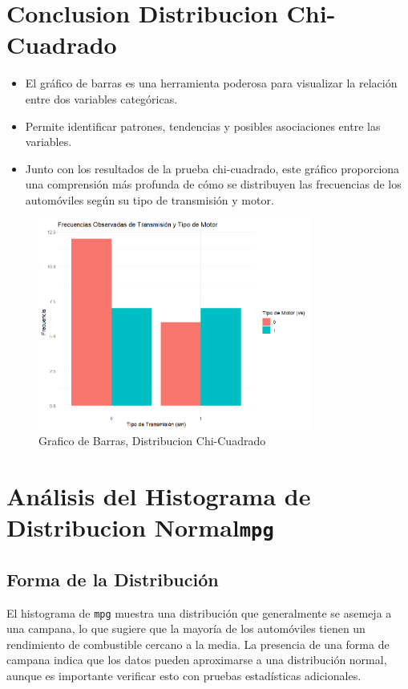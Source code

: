 \documentclass{article}
\begin{document}
\section{Conclusion Distribucion Chi-Cuadrado}
\begin{itemize}
	\item El gráfico de barras es una herramienta poderosa para visualizar la relación entre dos variables categóricas.
	\item Permite identificar patrones, tendencias y posibles asociaciones entre las variables.
	\item Junto con los resultados de la prueba chi-cuadrado, este gráfico proporciona una comprensión más profunda de cómo se distribuyen las frecuencias de los automóviles según su tipo de transmisión y motor.
\end{itemize}
\begin{figure}[H] %
	\centering %
	\includegraphics[width=0.8\textwidth]{Imagen2.png}
	\caption{Grafico de Barras, Distribucion Chi-Cuadrado} %
	\label{fig:mi_imagen} %
\end{figure}

\section{Análisis del Histograma de Distribucion Normal\texttt{mpg} }

\subsection{Forma de la Distribución}
El histograma de \texttt{mpg} muestra una distribución que generalmente se asemeja a una campana, lo que sugiere que la mayoría de los automóviles tienen un rendimiento de combustible cercano a la media. La presencia de una forma de campana indica que los datos pueden aproximarse a una distribución normal, aunque es importante verificar esto con pruebas estadísticas adicionales.
\end{document}
